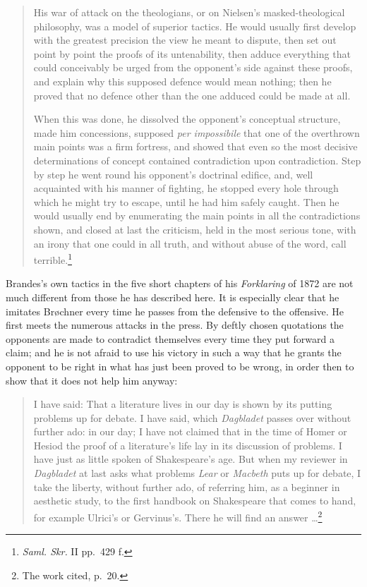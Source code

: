 \documentclass[12pt,a4paper,openany]{book}
\newcommand{\opage}[1]{\marginnote{\footnotesize\textit{[#1]}}}
\begin{document}
\begin{quote}\small

His war of attack on the theologians, or on Nielsen's masked-theological philosophy, was a model of superior
tactics. He would usually first develop with the greatest precision the view he meant to dispute, then set out
point by point the proofs of its untenability, then adduce everything that could conceivably be urged from the
opponent's side against these proofs, and explain why this supposed defence would mean nothing; then he proved that
no defence other than the one adduced could be made at all.

When this was done, he dissolved the opponent's conceptual structure, made him concessions, supposed \textit{per
impossibile} that one of the overthrown main points was a firm fortress, and showed that even so the most decisive
determinations of concept contained contradiction upon contradiction. Step by step he went round his opponent's
doctrinal edifice, and, well acquainted with his manner of fighting, he stopped every hole through which he might
try to escape, until he had him safely caught. Then he would usually end by enumerating the main points in all the
contradictions shown, and closed at last the criticism, held in the most serious tone, with an irony that one could
in all truth, and without abuse of the word, call terrible.\footnote{\textit{Saml. Skr.} II pp.~429 f.}

\medskip

\end{quote}

\opage{161}\setcounter{footnote}{0}%
Brandes's own tactics in the five short chapters of his \textit{Forklaring} of 1872 are not much different from
those he has described here. It is especially clear that he imitates Brøchner every time he passes from the
defensive to the offensive. He first meets the numerous attacks in the press. By deftly chosen quotations the
opponents are made to contradict themselves every time they put forward a claim; and he is not afraid to use his
victory in such a way that he grants the opponent to be right in what has just been proved to be wrong, in order
then to show that it does not help him anyway:

\medskip

\begin{quote}\small

I have said: That a literature lives in our day is shown by its putting problems up for debate. I have said, which
\textit{Dagbladet} passes over without further ado: in our day; I have not claimed that in the time of Homer or
Hesiod the proof of a literature's life lay in its discussion of problems. I have just as little spoken of
Shakespeare's age. But when my reviewer in \textit{Dagbladet} at last asks what problems \textit{Lear} or
\textit{Macbeth} puts up for debate, I take the liberty, without further ado, of referring him, as a beginner in
aesthetic study, to the first handbook on Shakespeare that comes to hand, for example Ulrici's or Gervinus's. There
he will find an answer \dots{}\footnote{The work cited, p.~20.}

\medskip

\end{quote}
\end{document}
